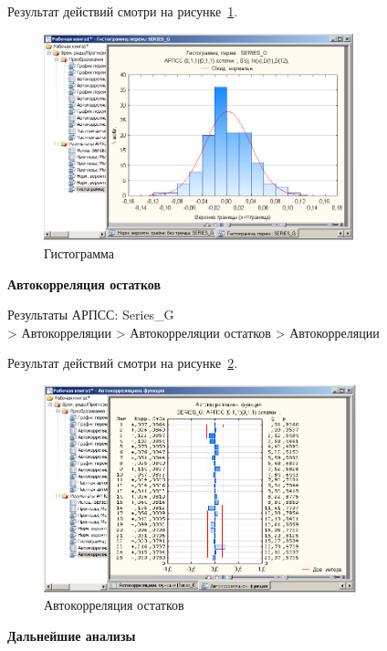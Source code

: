 Результат действий смотри на рисунке~\ref{fig:19}.

\begin{figure}[!h]
  \centering

  \includegraphics[height=6cm]
  {inc/19.PNG}

  \caption{Гистограмма}

  \label{fig:19}
\end{figure}

\begin{center}
  \textbf{Автокорреляция остатков}
\end{center}

\newpage

Результаты АРПСС: Series\_G\\
> Автокорреляции
> Автокорреляции остатков
> Автокорреляции

Результат действий смотри на рисунке~\ref{fig:20}.

\begin{figure}[!h]
  \centering

  \includegraphics[height=6cm]
  {inc/20.PNG}

  \caption{Автокорреляция остатков}

  \label{fig:20}
\end{figure}

\begin{center}
  \textbf{Дальнейшие анализы}
\end{center}

